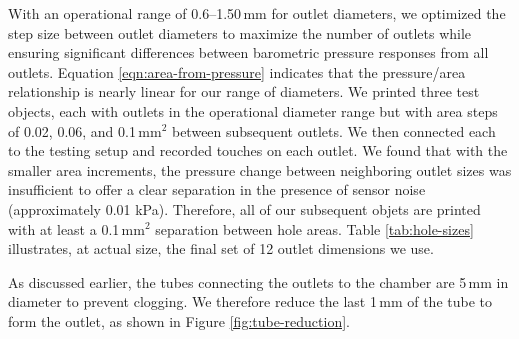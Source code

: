 				With an operational range of 0.6--1.50\,mm for outlet diameters, we
				optimized the step size between outlet diameters to maximize the number
				of outlets while ensuring significant differences between barometric
				pressure responses from all outlets. Equation
				\ref{eqn:area-from-pressure} indicates that the pressure/area
				relationship is nearly linear for our range of diameters. We printed
				three test objects, each with outlets in the operational diameter range
				but with area steps of 0.02, 0.06, and 0.1\,mm$^2$ between subsequent
				outlets. We then connected each to the testing setup and recorded
				touches on each outlet. We found that with the smaller area increments,
				the pressure change between neighboring outlet sizes was insufficient to
				offer a clear separation in the presence of sensor noise (approximately
				0.01 kPa). Therefore, all of our subsequent objets are printed with at
				least a 0.1\,mm$^2$ separation between hole areas. Table
				\ref{tab:hole-sizes} illustrates, at actual size, the final set of 12
				outlet dimensions we use.
            
				As discussed earlier, the tubes connecting the outlets to the chamber
				are 5\,mm in diameter to prevent clogging. We therefore reduce the last
				1\,mm of the tube to form the outlet, as shown in Figure
				\ref{fig:tube-reduction}.        


